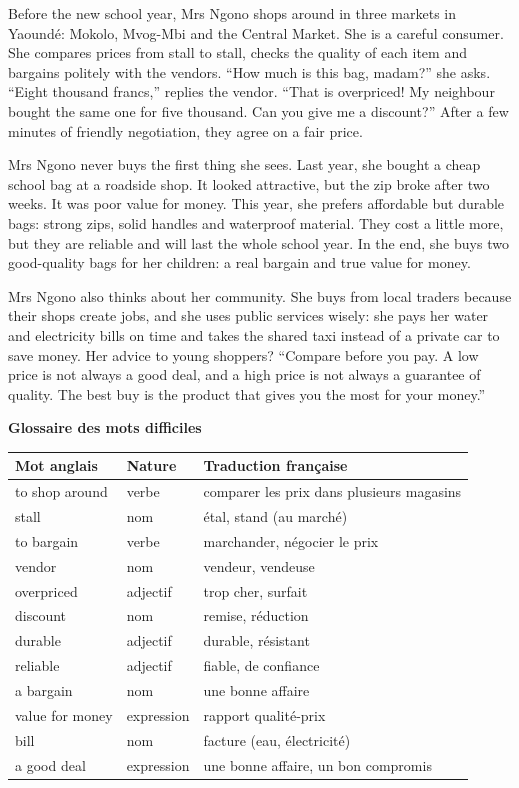 \documentclass[11pt]{article}
\begin{document}
\begin{textebox}
Before the new school year, Mrs Ngono shops around in three markets in Yaoundé: Mokolo, Mvog-Mbi and the Central Market. She is a careful consumer. She compares prices from stall to stall, checks the quality of each item and bargains politely with the vendors. “How much is this bag, madam?” she asks. “Eight thousand francs,” replies the vendor. “That is overpriced! My neighbour bought the same one for five thousand. Can you give me a discount?” After a few minutes of friendly negotiation, they agree on a fair price.

Mrs Ngono never buys the first thing she sees. Last year, she bought a cheap school bag at a roadside shop. It looked attractive, but the zip broke after two weeks. It was poor value for money. This year, she prefers affordable but durable bags: strong zips, solid handles and waterproof material. They cost a little more, but they are reliable and will last the whole school year. In the end, she buys two good-quality bags for her children: a real bargain and true value for money.

Mrs Ngono also thinks about her community. She buys from local traders because their shops create jobs, and she uses public services wisely: she pays her water and electricity bills on time and takes the shared taxi instead of a private car to save money. Her advice to young shoppers? “Compare before you pay. A low price is not always a good deal, and a high price is not always a guarantee of quality. The best buy is the product that gives you the most for your money.”
\end{textebox}

\textbf{Glossaire des mots difficiles}

\begin{center}
\begin{tabularx}{\linewidth}{|l|l|X|}
\hline
\rowcolor{popblueL} Mot anglais & Nature & Traduction française \\
\hline
to shop around & verbe & comparer les prix dans plusieurs magasins \\
\hline
stall & nom & étal, stand (au marché) \\
\hline
to bargain & verbe & marchander, négocier le prix \\
\hline
vendor & nom & vendeur, vendeuse \\
\hline
overpriced & adjectif & trop cher, surfait \\
\hline
discount & nom & remise, réduction \\
\hline
durable & adjectif & durable, résistant \\
\hline
reliable & adjectif & fiable, de confiance \\
\hline
a bargain & nom & une bonne affaire \\
\hline
value for money & expression & rapport qualité-prix \\
\hline
bill & nom & facture (eau, électricité) \\
\hline
a good deal & expression & une bonne affaire, un bon compromis \\
\hline
\end{tabularx}
\end{center}
\end{document}
